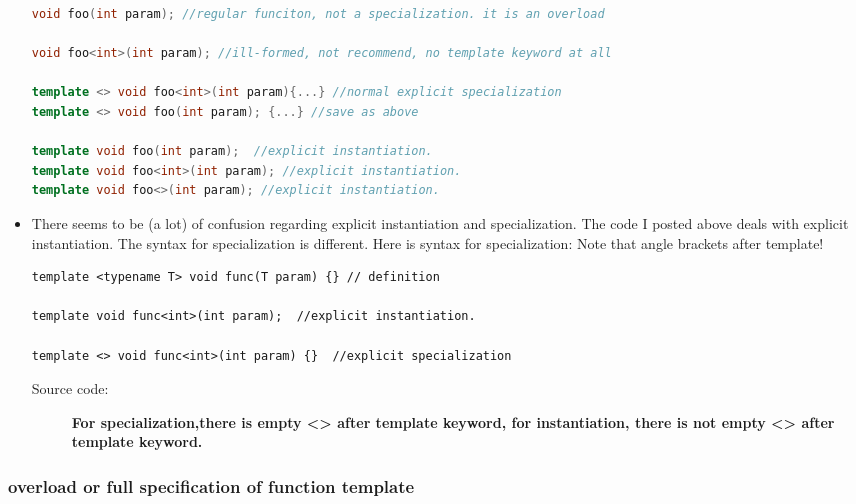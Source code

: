\documentclass[a4paper,11pt,twoside]{book}
\begin{document}
\begin{itemize}
\begin{lstlisting}[frame=single, language=c++]
void foo(int param); //regular funciton, not a specialization. it is an overload

void foo<int>(int param); //ill-formed, not recommend, no template keyword at all

template <> void foo<int>(int param){...} //normal explicit specialization
template <> void foo(int param); {...} //save as above

template void foo(int param);  //explicit instantiation.
template void foo<int>(int param); //explicit instantiation.
template void foo<>(int param); //explicit instantiation.
\end{lstlisting}

\item There seems to be (a lot) of confusion regarding explicit instantiation and specialization. The code I posted above deals with explicit instantiation. The syntax for specialization is different. Here is syntax for specialization: Note that angle brackets after template!

\begin{lstlisting}
template <typename T> void func(T param) {} // definition

template void func<int>(int param);  //explicit instantiation.

template <> void func<int>(int param) {}  //explicit specialization
\end{lstlisting}
\begin{description}
	\item[Source code:]\textbf{For specialization,there is empty <> after template keyword, for instantiation, there is not empty <> after template keyword.}
\end{description}

\end{itemize}

\subsubsection{overload or full specification of function template}
\end{document}
